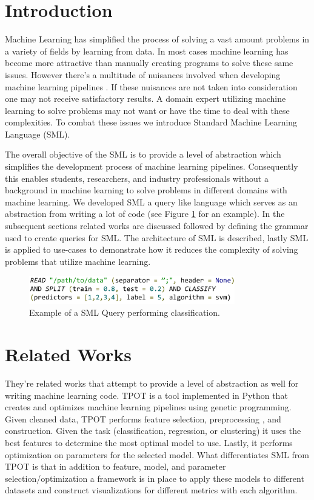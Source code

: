 \documentclass[jair,twoside,11pt,theapa]{article}
\begin{document}
\section{Introduction}
\label{Introduction}

Machine Learning has simplified the process of solving a vast amount problems in a variety of fields by learning from data. In most cases machine learning has become more attractive than manually creating programs to solve these same issues. However there's a multitude of nuisances involved when developing machine learning pipelines \cite{pedros:fewUsefulThings}. If these nuisances are not taken into consideration one may not receive satisfactory results. A domain expert utilizing machine learning to solve problems may not want or have the time to deal with these complexities. To combat these issues we introduce Standard Machine Learning Language (SML).

The overall objective of the SML is to provide a level of abstraction which simplifies the development process of machine learning pipelines. Consequently this enables students, researchers, and industry professionals without a background in machine learning to solve problems in different domains with machine learning. We developed SML a query like language which serves as an abstraction from writing a lot of code (see Figure \ref{fig:sml-ex-1} for an example). In the subsequent sections related works are discussed followed by defining the grammar used to create queries for SML. The architecture of SML is described, lastly SML is applied to use-cases to demonstrate how it reduces the complexity of solving problems that utilize machine learning.

\begin{figure}
\includegraphics[width=0.8\textwidth]{figs/sml-ex-1.png}
\centering
\caption{Example of a SML Query performing classification.}
\label{fig:sml-ex-1}
\end{figure}

\section{Related Works}
\label{RelatedWorks}

They're related works that attempt to provide a level of abstraction as well for writing machine learning code. TPOT \cite{TPOT} is a tool implemented in Python that creates and optimizes machine learning pipelines using genetic programming. Given cleaned data, TPOT performs feature selection, preprocessing , and construction. Given the task (classification, regression, or clustering) it uses the best features to determine the most optimal model to use. Lastly, it performs optimization on parameters for the selected model. What differentiates SML from TPOT is that in addition to feature, model, and parameter selection/optimization a framework is in place to apply these models to different datasets and construct visualizations for different metrics with each algorithm.
\end{document}
